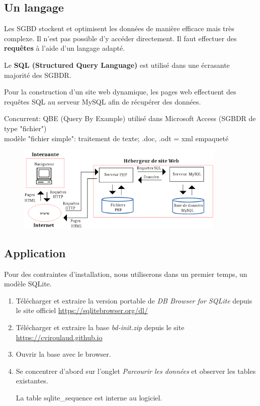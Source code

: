 \documentclass[a4paper,11pt]{article}
\begin{document}
\begin{Form}
\subsection{Un langage}
Les SGBD stockent et optimisent les données de manière efficace mais très complexe. Il n'est pas possible d'y accéder directement. Il faut effectuer des \textbf{requêtes} à l'aide d'un langage adapté.
\begin{aretenir}[]
Le \textbf{SQL (Structured Query Language)} est utilisé dans une écrasante majorité des SGBDR.
\end{aretenir}
Pour la construction d'un site web dynamique, les pages web effectuent des requêtes SQL au serveur MySQL afin de récupérer des données.
\begin{commentprof}
Concurrent: QBE (Query By Example) utilisé dans Microsoft Access	(SGBDR de type "fichier")\\
modèle "fichier simple": traitement de texte; .doc, .odt = xml empaqueté
\end{commentprof}
\begin{figure}[!h]
\centering
\includegraphics[width=10cm]{ressources/requete-http.png}
\label{modeles}
\end{figure}
\subsection{Application}
Pour des contraintes d'installation, nous utiliserons dans un premier temps, un modèle SQLite.
\begin{activite}
\begin{enumerate}
\item Télécharger et extraire la version portable de \emph{DB Browser for SQLite} depuis le site officiel \mbox{\url{https://sqlitebrowser.org/dl/}}
\item Télécharger et extraire la base \emph{bd-init.zip} depuis le site \mbox{\url{https://cviroulaud.github.io}}
\item Ouvrir la base avec le browser.
\item Se concentrer d'abord sur l'onglet \emph{Parcourir les données} et observer les tables existantes.
\begin{commentprof}
La table sqlite\_sequence est interne au logiciel.
\end{commentprof}
\end{enumerate}
\end{activite}

\end{Form}
\end{document}
